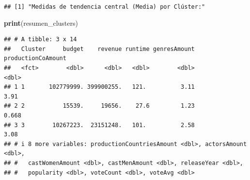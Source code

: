 \documentclass[
]{article}
\newenvironment{Shaded}{\begin{snugshade}}{\end{snugshade}}
\newcommand{\AttributeTok}[1]{\textcolor[rgb]{0.13,0.29,0.53}{#1}}
\newcommand{\CommentTok}[1]{\textcolor[rgb]{0.56,0.35,0.01}{\textit{#1}}}
\newcommand{\ConstantTok}[1]{\textcolor[rgb]{0.56,0.35,0.01}{#1}}
\newcommand{\FunctionTok}[1]{\textcolor[rgb]{0.13,0.29,0.53}{\textbf{#1}}}
\newcommand{\NormalTok}[1]{#1}
\newcommand{\OtherTok}[1]{\textcolor[rgb]{0.56,0.35,0.01}{#1}}
\newcommand{\SpecialCharTok}[1]{\textcolor[rgb]{0.81,0.36,0.00}{\textbf{#1}}}
\newcommand{\StringTok}[1]{\textcolor[rgb]{0.31,0.60,0.02}{#1}}
\begin{document}
\begin{Shaded}
\end{Shaded}

\begin{verbatim}
## [1] "Medidas de tendencia central (Media) por Clúster:"
\end{verbatim}

\begin{Shaded}
\begin{Highlighting}[]
\FunctionTok{print}\NormalTok{(resumen\_clusters)}
\end{Highlighting}
\end{Shaded}

\begin{verbatim}
## # A tibble: 3 x 14
##   Cluster     budget    revenue runtime genresAmount productionCoAmount
##   <fct>        <dbl>      <dbl>   <dbl>        <dbl>              <dbl>
## 1 1       102779999. 399900255.   121.          3.11              3.91 
## 2 2           15539.     19656.    27.6         1.23              0.668
## 3 3        10267223.  23151248.   101.          2.58              3.08 
## # i 8 more variables: productionCountriesAmount <dbl>, actorsAmount <dbl>,
## #   castWomenAmount <dbl>, castMenAmount <dbl>, releaseYear <dbl>,
## #   popularity <dbl>, voteCount <dbl>, voteAvg <dbl>
\end{verbatim}
\end{document}
